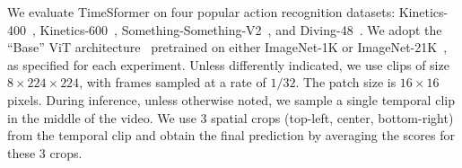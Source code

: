 \documentclass{article}
\newcommand{\LT}[1]{\textcolor{blue}{{\bf LT:} #1}}
\begin{document}


We evaluate TimeSformer on four popular action recognition datasets: Kinetics-400~\cite{DBLP:conf/cvpr/CarreiraZ17}, Kinetics-600~\cite{DBLP:journals/corr/abs-1808-01340}, Something-Something-V2~\cite{DBLP:journals/corr/GoyalKMMWKHFYMH17}, and Diving-48~\cite{Li_2018_ECCV}. We adopt the ``Base'' ViT architecture~\cite{Dosovitskiy:ICLR2021} pretrained on either ImageNet-1K or ImageNet-21K~\cite{5206848}, as specified for each experiment. Unless  differently indicated, we use clips of size $8 \times 224 \times 224$, with frames sampled at a rate of $1/32$. The patch size is $16\times16$ pixels. During inference, %
unless otherwise noted, 
we sample a single temporal clip in the middle of the video. We use $3$ spatial crops (top-left, center, bottom-right) from the temporal clip and obtain the final prediction by averaging the scores for these $3$ crops. %



\end{document}
